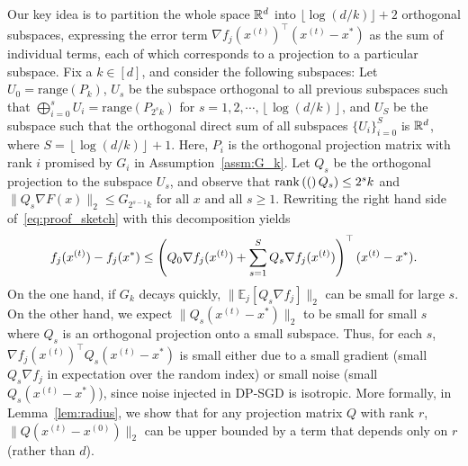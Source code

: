 
Our key idea is to partition the whole space $\mathbb{R}^d$ into  $\lfloor \log(d/k) \rfloor + 2$ orthogonal subspaces, expressing the error term $\nabla f_j(x^{(t)})^\top (x^{(t)}-x^*)$ as the sum of individual terms, each of which corresponds to a projection to a particular subspace.
Fix a $k \in [d]$, and consider the following subspaces:
Let $U_{0}=\text{range}(P_{k})$,
 $U_{s}$ be the subspace orthogonal to all previous subspaces such that $\bigoplus_{i=0}^s U_i = \text{range}(P_{2^sk})$ for $s=1,2,\cdots,\left\lfloor \log(d/k)\right\rfloor $,
and $U_{S}$ be the subspace such that the orthogonal direct sum of all subspaces $\{U_i\}_{i=0}^S$ is $\mathbb{R}^d$, where $S=\left\lfloor \log(d/k)\right\rfloor +1$.
Here, $P_{i}$ is the orthogonal projection matrix with rank $i$ promised by $G_{i}$ in Assumption~\ref{assm:G_k}. 
Let $Q_{s}$ be the orthogonal projection to the subspace $U_{s}$, and observe that $\mathrm{rank}\left((\right)Q_{s}) \leq 2^{s}k$ and
$\|Q_{s}\nabla F(x)\|_{2}\leq G_{2^{s-1}k}\text{ for all }x\text{ and all }s\geq1.$
Rewriting the right hand side of~\eqref{eq:proof_sketch} with this decomposition yields
$$
f_{j}(x^{(t)})-f_{j}(x^{*})  \leq \left( Q_{0}\nabla f_{j}(x^{(t)})+\sum_{s=1}^{S} Q_{s}\nabla f_{j}(x^{(t)})\right)^{\top}(x^{(t)}-x^{*}).    
$$
On the one hand, if $G_k$ decays quickly, $\| \mathbb{E}_j [  Q_{s} \nabla f_{j} ] \|_2$ can be small for large $s$. 
On the other hand, we expect $\|Q_{s} (x^{(t)}-x^{*})\|_2$ to be small for small $s$ where $Q_{s}$ is an orthogonal projection onto a small subspace. 
Thus, for each $s$, $\nabla f_{j}(x^{(t)})^{\top} Q_{s} (x^{(t)}-x^{*})$ is small either due to a small gradient (small $Q_s \nabla f_{j}$ in expectation over the random index) or small noise (small $Q_{s} (x^{(t)}-x^{*})$), since noise injected in DP-SGD is isotropic. 
More formally, in Lemma~\ref{lem:radius}, we show that for any projection matrix $Q$ with rank $r$, $\|Q(x^{(t)}-x^{(0)})\|_2$ can be upper bounded by a term that depends only on $r$ (rather than $d$).


